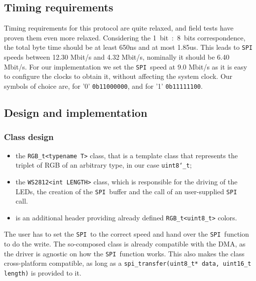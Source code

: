 \documentclass[10pt,a4]{article}
\newcommand{\ws}{\texttt{WS2812 }}
\newcommand{\spi}{\texttt{SPI }}
\newcommand{\type}{\char`_t}
\begin{document}
\subsection{Timing requirements}



Timing requirements for this protocol are quite relaxed, and field tests \cite{cpldcpu} have proven them even more relaxed. Considering the 1~bit~:~8~bits correspondence, the total byte time should be at least 650ns and at most 1.85us. This leads to \spi speeds between 12.30 Mbit/s and 4.32 Mbit/s, nominally it should be 6.40 Mbit/s. 
For our implementation we set the \spi speed at 9.0 Mbit/s as it is easy to configure the clocks to obtain it, without affecting the system clock. Our symbols of choice are, for '0' \texttt{0b11000000}, and for '1' \texttt{0b11111100}.

\subsection{Design and implementation}
\subsubsection{Class design}
\begin{itemize}
    \item 
the \lstinline{RGB_t<typename T>} class, that is a template class that represents the triplet of RGB of an arbitrary type, in our case \texttt{uint8\type};
    \item the \lstinline{WS2812<int LENGTH>} class, which is responsible for the driving of the LEDs, the creation of the \spi buffer and the call of an user-supplied \spi call.
    \item is an additional header providing already defined \lstinline{RGB_t<uint8_t>} colors.
\end{itemize}

The user has to set the \spi to the correct speed and hand over the \spi function to do the write. The so-composed class is already compatible with the DMA, as the driver is agnostic on how the \spi function works. This also makes the class cross-platform compatible, as long as a \lstinline{spi_transfer(uint8_t* data, uint16_t length)} is provided to it.
\end{document}
